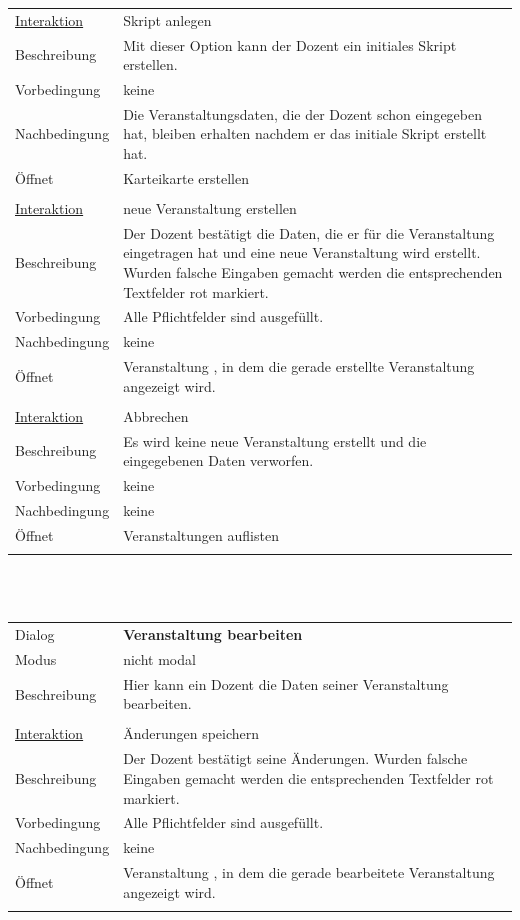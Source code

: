 \documentclass[12pt,a4paper]{article}
\begin{document}
{\begin{tabular}{l p{12cm}}
\underline{Interaktion}  	 & Skript anlegen\\ 
Beschreibung   	 & Mit dieser Option kann der Dozent ein initiales Skript erstellen.\\
Vorbedingung   	 & keine\\
Nachbedingung 	 & Die Veranstaltungsdaten, die der Dozent schon eingegeben hat, bleiben erhalten nachdem er das initiale Skript erstellt hat.\\
Öffnet			 & \glqq Karteikarte erstellen\grqq \\\\

\underline{Interaktion}  	 & neue Veranstaltung erstellen\\ 
Beschreibung   	 & Der Dozent bestätigt die Daten, die er für die Veranstaltung eingetragen hat und eine neue Veranstaltung wird erstellt. Wurden falsche Eingaben gemacht werden die entsprechenden Textfelder rot markiert. \\
Vorbedingung   	 & Alle Pflichtfelder sind ausgefüllt.\\
Nachbedingung	 & keine\\
Öffnet			 & \glqq Veranstaltung \grqq, in dem die gerade erstellte Veranstaltung angezeigt wird. \\\\

\underline{Interaktion}  	 & Abbrechen\\ 
Beschreibung   	 & Es wird keine neue Veranstaltung erstellt und die eingegebenen Daten verworfen.  \\
Vorbedingung	 & keine \\
Nachbedingung	 & keine \\
Öffnet			 & \glqq Veranstaltungen auflisten\grqq \\\\
\hline
\end{tabular}\\\\

\begin{tabular}{l p{12cm}}
Dialog 	 & \textbf{Veranstaltung bearbeiten} \\ 
Modus & nicht modal\\ 
Beschreibung   	 & Hier kann ein Dozent die Daten seiner Veranstaltung bearbeiten. \\\\

\underline{Interaktion}  	 & Änderungen speichern\\ 
Beschreibung   	 & Der Dozent bestätigt seine Änderungen. Wurden falsche Eingaben gemacht werden die entsprechenden Textfelder rot markiert. \\
Vorbedingung   	 & Alle Pflichtfelder sind ausgefüllt.\\
Nachbedingung	 & keine\\
Öffnet			 & \glqq Veranstaltung \grqq, in dem die gerade bearbeitete Veranstaltung angezeigt wird. \\\\


\end{tabular}}
\end{document}

